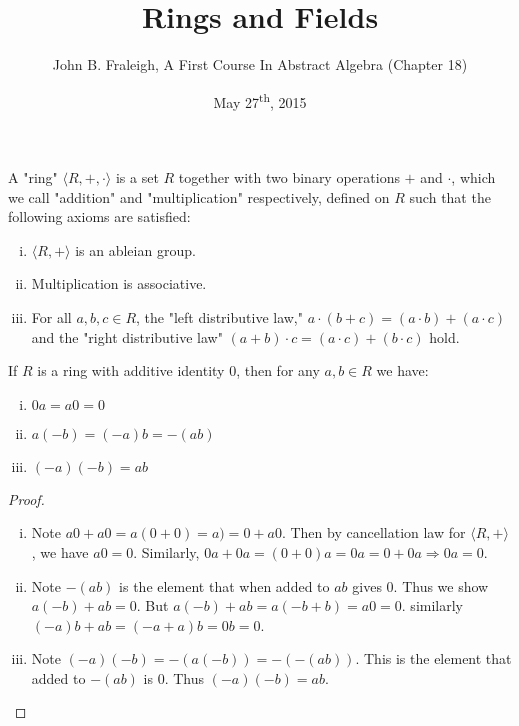 \documentclass[a4paper,11pt]{article}
\title{Rings and Fields}
\author{John B. Fraleigh, A First Course In Abstract Algebra (Chapter 18)}
\date{May 27\textsuperscript{th}, 2015}
\begin{document}
\maketitle
{}

\begin{outline}

    A "ring" \(\langle R, +, \cdot \rangle\) is a set \(R\) together with two binary operations
    \(+\) and \(\cdot\), which we call "addition" and "multiplication" respectively, defined on \(R\) such that the
    following axioms are satisfied:
    \begin{enumerate}[i.]
      \item \(\langle R, + \rangle\) is an ableian group.
      \item Multiplication is associative.
      \item For all \(a, b, c \in R\), the "left distributive law," \(a \cdot (b + c) = (a \cdot b) + (a \cdot c)\) and
      the "right distributive law" \((a + b) \cdot c = (a \cdot c) + (b \cdot c)\) hold.
    \end{enumerate}

    If \(R\) is a ring with additive identity \(0\), then for any \(a, b \in R\) we have:
    \begin{enumerate}[i.]
      \item \(0a = a0 = 0\)
      \item \(a(-b) = (-a)b = -(ab)\)
      \item \((-a)(-b) = ab\)
    \end{enumerate}
    
    \begin{proof}
      \begin{enumerate}[i.]
        \item 
          Note \(a0 + a0 = a(0 + 0) = a) = 0 + a0\). Then by cancellation law for \(\langle R, + \rangle\), we have 
          \(a0 = 0\). Similarly, \(0a + 0a = (0 + 0)a = 0a = 0 + 0a \Rightarrow 0a = 0\).
        \item 
          Note \(-(ab)\) is the element that when added to \(ab\) gives \(0\). Thus we show \(a(-b) + ab = 0\). But
          \(a(-b) + ab = a(-b + b) = a0 = 0\). similarly \((-a)b + ab = (-a + a)b = 0b = 0\).
        \item 
          Note \((-a)(-b) = -(a(-b)) = -(-(ab))\). This is the element that added to \(-(ab)\) is \(0\). Thus
          \((-a)(-b) = ab\).
      \end{enumerate}
    \end{proof}
      

\end{outline}
\end{document}
